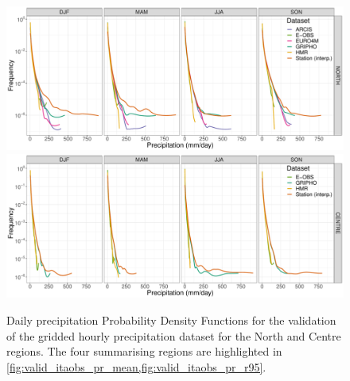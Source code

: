 \begin{figure}
    \centering
        \includegraphics[width=0.8\textheight]{figures/valid_itaobs/pdf_NORTH_lines}
        \includegraphics[width=0.8\textheight]{figures/valid_itaobs/pdf_CENTRE_lines}
    \caption[Validation of gridded hourly dataset: PDFs (1)]{
        Daily precipitation Probability Density Functions for the validation of the gridded hourly precipitation dataset for the North and Centre regions. The four summarising regions are highlighted in \cref{fig:valid_itaobs_pr_mean,fig:valid_itaobs_pr_r95}.
    }\label{fig:valid_itaobs_pr_pdf1}
\end{figure}

